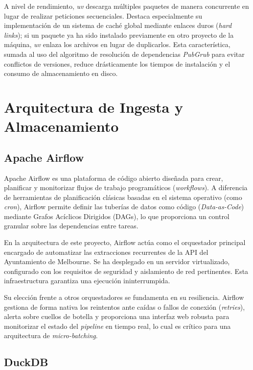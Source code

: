 A nivel de rendimiento, \textit{uv} descarga múltiples paquetes de manera concurrente en lugar de realizar peticiones secuenciales. Destaca especialmente su implementación de un sistema de caché global mediante enlaces duros (\textit{hard links}); si un paquete ya ha sido instalado previamente en otro proyecto de la máquina, \textit{uv} enlaza los archivos en lugar de duplicarlos. Esta característica, sumada al uso del algoritmo de resolución de dependencias \textit{PubGrub} para evitar conflictos de versiones, reduce drásticamente los tiempos de instalación y el consumo de almacenamiento en disco.





\section{Arquitectura de Ingesta y Almacenamiento}
\label{sec:ingesta_almacenamiento}

\subsection{Apache Airflow}
\label{subsec:airflow}

Apache Airflow es una plataforma de código abierto diseñada para crear, planificar y monitorizar flujos de trabajo programáticos (\textit{workflows}). A diferencia de herramientas de planificación clásicas basadas en el sistema operativo (como \textit{cron}), Airflow permite definir las tuberías de datos como código (\textit{Data-as-Code}) mediante Grafos Acíclicos Dirigidos (DAGs), lo que proporciona un control granular sobre las dependencias entre tareas.

En la arquitectura de este proyecto, Airflow actúa como el orquestador principal encargado de automatizar las extracciones recurrentes de la API del Ayuntamiento de Melbourne. Se ha desplegado en un servidor virtualizado, configurado con los requisitos de seguridad y aislamiento de red pertinentes. Esta infraestructura garantiza una ejecución ininterrumpida.

Su elección frente a otros orquestadores se fundamenta en su resiliencia. Airflow gestiona de forma nativa los reintentos ante caídas o fallos de conexión (\textit{retries}), alerta sobre cuellos de botella y proporciona una interfaz web robusta para monitorizar el estado del \textit{pipeline} en tiempo real, lo cual es crítico para una arquitectura de \textit{micro-batching}.

\subsection{DuckDB}
\label{subsec:duckdb}

